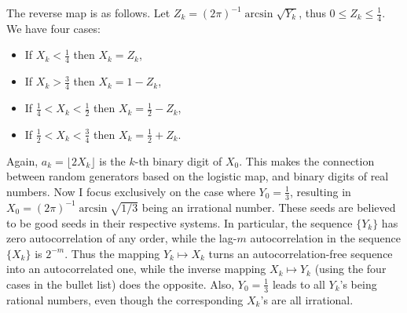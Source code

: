 \documentclass[oneside,10pt]{book}
\begin{document}
\noindent The reverse map is as follows. Let $Z_k = (2\pi)^{-1}\arcsin\sqrt{Y_k}$, thus $0\leq Z_k\leq\frac{1}{4}$. We have four cases: \vspace{1ex}
\begin{itemize}
\item   If $X_k < \frac{1}{4}$  then $X_k=Z_k$,  %
\item   If $X_k > \frac{3}{4}$  then $X_k = 1 - Z_k$,  %
\item   If $\frac{1}{4} < X_k < \frac{1}{2}$ then $X_k  = \frac{1}{2} - Z_k$, %
\item   If $\frac{1}{2} < X_k < \frac{3}{4}$ then  $X_k=\frac{1}{2} + Z_k$. %
\end{itemize}\vspace{1ex}
Again, $a_k=\lfloor 2X_k\rfloor$ is the $k$-th binary digit of $X_0$. This makes the connection between random generators based on the logistic map, and binary digits of real numbers.
Now I focus exclusively on the case where $Y_0=\frac{1}{3}$, resulting in
$X_0=(2\pi)^{-1}\arcsin \sqrt{1/3}$ being an irrational number. These seeds
 are believed to be \textcolor{index}{good seeds} in their respective systems.
 In particular, the sequence $\{Y_k\}$ has zero autocorrelation of any order, while the lag-$m$ autocorrelation in the sequence
 $\{X_k\}$ is $2^{-m}$.
Thus the mapping $Y_k \mapsto X_k$ turns an autocorrelation-free sequence into an autocorrelated one,
 while the inverse mapping $X_k \mapsto Y_k$ (using the four cases in the bullet list) does the opposite.
Also, $Y_0=\frac{1}{3}$ leads to all $Y_k$'s being rational numbers, even though
 the corresponding $X_k$'s are all irrational.
\end{document}
